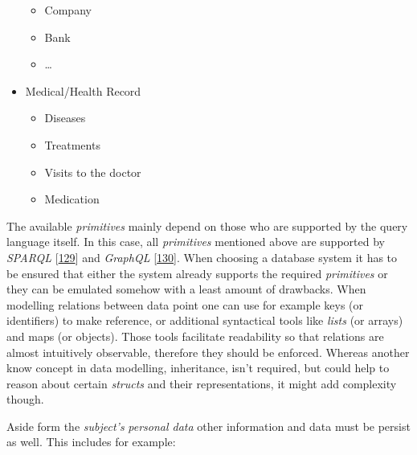 \documentclass[12pt,english,a4paper,titlepage,cleardoublepage=empty,dottedtoc]{report}
\providecommand{\tightlist}{%
  \setlength{\itemsep}{0pt}\setlength{\parskip}{0pt}}
\begin{document}
\begin{itemize}
  \begin{itemize}
  \tightlist
  \item
    Company
  \item
    Bank
  \item
    \ldots{}
  \end{itemize}
\item
  Medical/Health Record

  \begin{itemize}
  \tightlist
  \item
    Diseases
  \item
    Treatments
  \item
    Visits to the doctor
  \item
    Medication
  \end{itemize}
\end{itemize}

The available \emph{primitives} mainly depend on those who are supported
by the query language itself. In this case, all \emph{primitives}
mentioned above are supported by \emph{SPARQL}
{[}\protect\hyperlink{ref-web_spec_xml_types}{129}{]} and \emph{GraphQL}
{[}\protect\hyperlink{ref-web_spec_graphql_types}{130}{]}. When choosing
a database system it has to be ensured that either the system already
supports the required \emph{primitives} or they can be emulated somehow
with a least amount of drawbacks. When modelling relations between data
point one can use for example keys (or identifiers) to make reference,
or additional syntactical tools like \emph{lists} (or arrays) and maps
(or objects). Those tools facilitate readability so that relations are
almost intuitively observable, therefore they should be enforced.
Whereas another know concept in data modelling, inheritance, isn't
required, but could help to reason about certain \emph{structs} and
their representations, it might add complexity though.

Aside form the \emph{subject's} \emph{personal data} other information
and data must be persist as well. This includes for example:
\end{document}
